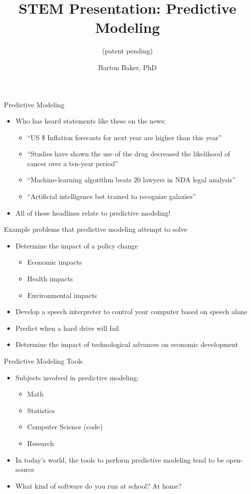 \documentclass[10pt]{beamer}
\title{STEM Presentation: Predictive Modeling}
\subtitle{(patent pending)}
\author{Barton Baker, PhD}
\begin{document}
\frame{\titlepage}

\begin{frame}[t]{Predictive Modeling}
  \begin{itemize}
    \item Who has heard statements like these on the news:
    \begin{itemize}
      \item<2-> ``US \$ Inflation forecasts for next year are higher than this
        year''
      \item<3-> ``Studies have shown the use of the drug decreased the
        likelihood of cancer over a ten-year period''
      \item<4-> ``Machine-learning algorithm beats 20 lawyers in NDA legal
        analysis''
      \item<5-> ``Artificial intelligence bot trained to recognize galaxies''
    \end{itemize}
    \item<6-> All of these headlines relate to predictive modeling!
  \end{itemize}
\end{frame}

\begin{frame}[t]{Example problems that predictive modeling attempt to solve}
  \begin{itemize}
    \item Determine the impact of a policy change
      \begin{itemize}
        \item Economic impacts
        \item Health impacts
        \item Environmental impacts
      \end{itemize}
    \item<2-> Develop a speech interpreter to control your computer based on
      speech alone
    \item<3-> Predict when a hard drive will fail
    \item<4-> Determine the impact of technological advances on economic
      development
  \end{itemize}

\end{frame}

\begin{frame}[t]{Predictive Modeling Tools}
  \begin{itemize}
    \item Subjects involved in predictive modeling:
    \begin{itemize}
      \item Math
      \item Statistics
      \item Computer Science (code)
      \item Research
    \end{itemize}
    \item In today's world, the tools to perform predictive modeling tend to be
      open-source
    \item What kind of software do you run at school? At home?
  \end{itemize}
\end{frame}
\end{document}
